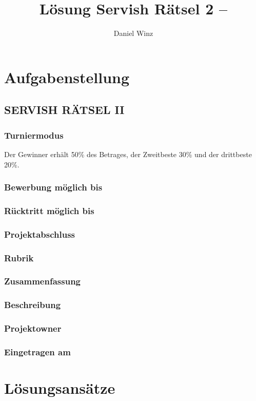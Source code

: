 \documentclass[10pt, fleqn]{article}
\title{Lösung Servish Rätsel 2 -- }
\author{Daniel Winz}
\begin{document}
\vfill
\maketitle
\vfill
\tableofcontents
\vfill
\newpage

\section{Aufgabenstellung}

\subsection*{SERVISH RÄTSEL II}

\subsubsection*{Turniermodus}
Der Gewinner erhält 50\% des Betrages, der Zweitbeste 30\% und der drittbeste 20\%. 

\subsubsection*{Bewerbung möglich bis}

\subsubsection*{Rücktritt möglich bis}

\subsubsection*{Projektabschluss}

\subsubsection*{Rubrik}

\subsubsection*{Zusammenfassung}

\subsubsection*{Beschreibung}

\subsubsection*{Projektowner}

\subsubsection*{Eingetragen am}

\newpage

\section{Lösungsansätze}
\end{document}
